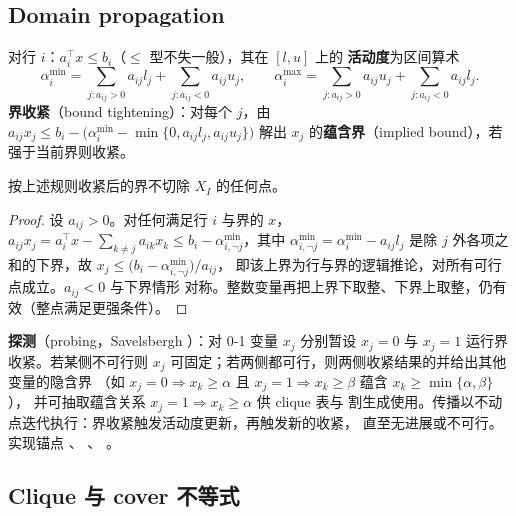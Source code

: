 \subsection{Domain propagation}
\label{subsec:domain-propagation}

\begin{definition}[行活动度与蕴含界]
对行 $i$：$a_i^\top x \le b_i$（$\le$ 型不失一般），其在 $[l,u]$ 上的
\textbf{活动度}为区间算术
\[
\alpha_i^{\min} = \sum_{j: a_{ij} > 0} a_{ij} l_j + \sum_{j: a_{ij} < 0} a_{ij} u_j,
\qquad
\alpha_i^{\max} = \sum_{j: a_{ij} > 0} a_{ij} u_j + \sum_{j: a_{ij} < 0} a_{ij} l_j .
\]
\textbf{界收紧}（bound tightening）：对每个 $j$，由
$a_{ij} x_j \le b_i - \big(\alpha_i^{\min} - \min\{0, a_{ij}l_j, a_{ij}u_j\}\big)$
解出 $x_j$ 的\textbf{蕴含界}（implied bound），若强于当前界则收紧。
\end{definition}

\begin{proposition}[蕴含界的有效性]
\label{prop:implied-bounds}
按上述规则收紧后的界不切除 $X_I$ 的任何点。
\end{proposition}
\begin{proof}
设 $a_{ij} > 0$。对任何满足行 $i$ 与界的 $x$，
$a_{ij} x_j = a_i^\top x - \sum_{k \ne j} a_{ik} x_k
\le b_i - \alpha_{i,\neg j}^{\min}$，其中
$\alpha_{i,\neg j}^{\min} = \alpha_i^{\min} - a_{ij} l_j$
是除 $j$ 外各项之和的下界，故
$x_j \le \big(b_i - \alpha_{i,\neg j}^{\min}\big)/a_{ij}$，
即该上界为行与界的逻辑推论，对所有可行点成立。$a_{ij} < 0$ 与下界情形
对称。整数变量再把上界下取整、下界上取整，仍有效（整点满足更强条件）。
\end{proof}

\textbf{探测}（probing，Savelsbergh \cite{savelsbergh1994}）：对 0-1 变量
$x_j$ 分别暂设 $x_j = 0$ 与 $x_j = 1$ 运行界收紧。若某侧不可行则
$x_j$ 可固定；若两侧都可行，则两侧收紧结果的并给出其他变量的隐含界
（如 $x_j = 0 \Rightarrow x_k \ge \alpha$ 且
$x_j = 1 \Rightarrow x_k \ge \beta$ 蕴含 $x_k \ge \min\{\alpha, \beta\}$），
并可抽取蕴含关系 $x_j = 1 \Rightarrow x_k \ge \alpha$ 供 clique 表与
割生成使用。传播以不动点迭代执行：界收紧触发活动度更新，再触发新的收紧，
直至无进展或不可行。实现锚点
、
、
。

\subsection{Clique 与 cover 不等式}
\label{subsec:clique-cover}

